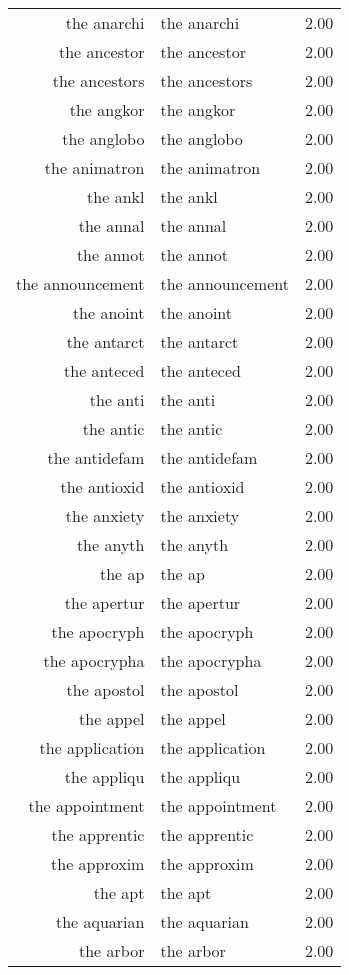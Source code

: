 \begin{table}[ht]
\begin{tabular}{rlr}
  the anarchi & the anarchi & 2.00 \\ 
  the ancestor & the ancestor & 2.00 \\ 
  the ancestors & the ancestors & 2.00 \\ 
  the angkor & the angkor & 2.00 \\ 
  the anglobo & the anglobo & 2.00 \\ 
  the animatron & the animatron & 2.00 \\ 
  the ankl & the ankl & 2.00 \\ 
  the annal & the annal & 2.00 \\ 
  the annot & the annot & 2.00 \\ 
  the announcement & the announcement & 2.00 \\ 
  the anoint & the anoint & 2.00 \\ 
  the antarct & the antarct & 2.00 \\ 
  the anteced & the anteced & 2.00 \\ 
  the anti & the anti & 2.00 \\ 
  the antic & the antic & 2.00 \\ 
  the antidefam & the antidefam & 2.00 \\ 
  the antioxid & the antioxid & 2.00 \\ 
  the anxiety & the anxiety & 2.00 \\ 
  the anyth & the anyth & 2.00 \\ 
  the ap & the ap & 2.00 \\ 
  the apertur & the apertur & 2.00 \\ 
  the apocryph & the apocryph & 2.00 \\ 
  the apocrypha & the apocrypha & 2.00 \\ 
  the apostol & the apostol & 2.00 \\ 
  the appel & the appel & 2.00 \\ 
  the application & the application & 2.00 \\ 
  the appliqu & the appliqu & 2.00 \\ 
  the appointment & the appointment & 2.00 \\ 
  the apprentic & the apprentic & 2.00 \\ 
  the approxim & the approxim & 2.00 \\ 
  the apt & the apt & 2.00 \\ 
  the aquarian & the aquarian & 2.00 \\ 
  the arbor & the arbor & 2.00 \\ 

\end{tabular}
\end{table}
